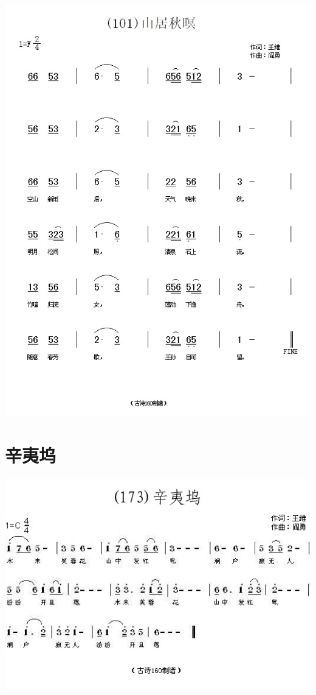\documentclass[cn,pad,chinesefont=nofont,twocol]{elegantbook}
\begin{document}
\section{}
    \includegraphics[width=\textwidth]{dongxiao/20200627-王维-山居秋暝.jpg} 
\section{辛夷坞}
    \includegraphics[width=\textwidth]{dongxiao/20200627-王维-辛夷坞.jpg} 
\end{document}
